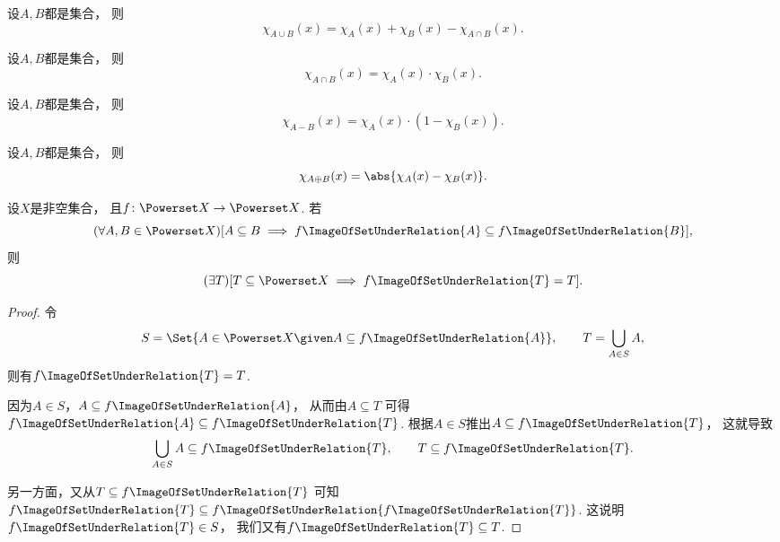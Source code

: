\begin{proposition}
设\(A,B\)都是集合，
则\[
	\chi_{A \cup B}(x)
	= \chi_A(x) + \chi_B(x) - \chi_{A \cap B}(x).
\]
\end{proposition}

\begin{proposition}
设\(A,B\)都是集合，
则\[
	\chi_{A \cap B}(x)
	= \chi_A(x) \cdot \chi_B(x).
\]
\end{proposition}

\begin{proposition}
设\(A,B\)都是集合，
则\[
	\chi_{A - B}(x)
	= \chi_A(x) \cdot (1 - \chi_B(x)).
\]
\end{proposition}

\begin{proposition}
设\(A,B\)都是集合，
则\[
	\chi_{A \oplus B}(x)
	= \abs{\chi_A(x) - \chi_B(x)}.
\]
\end{proposition}

\begin{example}
设\(X\)是非空集合，
且\(f\colon \Powerset X \to \Powerset X\).
若\[
	(\forall A,B \in \Powerset X)
	[
		A \subseteq B
		\implies
		f\ImageOfSetUnderRelation{A} \subseteq f\ImageOfSetUnderRelation{B}
	],
\]
则\[
	(\exists T)
	[
		T \subseteq \Powerset X
		\implies
		f\ImageOfSetUnderRelation{T} = T
	].
\]
\begin{proof}
令\[
	S = \Set{ A \in \Powerset X \given A \subseteq f\ImageOfSetUnderRelation{A} },
	\qquad
	T = \bigcup_{A \in S} A,
\]
则有\(f\ImageOfSetUnderRelation{T} = T\).

因为\(A \in S\)，\(A \subseteq f\ImageOfSetUnderRelation{A}\)，
从而由\(A \subseteq T\)
可得\(f\ImageOfSetUnderRelation{A} \subseteq f\ImageOfSetUnderRelation{T}\).
根据\(A \in S\)推出\(A \subseteq f\ImageOfSetUnderRelation{T}\)，
这就导致\[
	\bigcup_{A \in S} A \subseteq f\ImageOfSetUnderRelation{T},
	\qquad
	T \subseteq f\ImageOfSetUnderRelation{T}.
\]

另一方面，又从\(T \subseteq f\ImageOfSetUnderRelation{T}\)
可知\(f\ImageOfSetUnderRelation{T} \subseteq f\ImageOfSetUnderRelation{f\ImageOfSetUnderRelation{T}}\).
这说明\(f\ImageOfSetUnderRelation{T} \in S\)，
我们又有\(f\ImageOfSetUnderRelation{T} \subseteq T\).
\end{proof}
\end{example}

